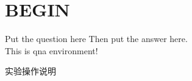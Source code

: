 \documentclass{spaexp}
\begin{document}
     
\maketitle
\section{BEGIN}

\begin{qna}{Put the question here}
    Then put the answer here.\\
    This is qna environment!
\end{qna}


\begin{step}
    \caption{实验操作说明}\\
    \movehead
\end{step}

\recordhead
\end{document}
